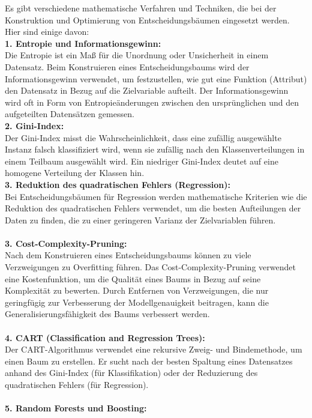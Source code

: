 \documentclass[12pt]{article}
\begin{document}
Es gibt verschiedene mathematische Verfahren und Techniken, die bei der Konstruktion und Optimierung von Entscheidungsbäumen eingesetzt werden. Hier sind einige davon:\\
%
\textbf{1. Entropie und Informationsgewinn:}\\
Die Entropie ist ein Maß für die Unordnung oder Unsicherheit in einem Datensatz. Beim Konstruieren eines Entscheidungsbaums wird der Informationsgewinn verwendet, um festzustellen, wie gut eine Funktion (Attribut) den Datensatz in Bezug auf die Zielvariable aufteilt. Der Informationsgewinn wird oft in Form von Entropieänderungen zwischen den ursprünglichen und den aufgeteilten Datensätzen gemessen.\\[0.2cm]
%
\textbf{2. Gini-Index:}\\
Der Gini-Index misst die Wahrscheinlichkeit, dass eine zufällig ausgewählte Instanz falsch klassifiziert wird, wenn sie zufällig nach den Klassenverteilungen in einem Teilbaum ausgewählt wird. Ein niedriger Gini-Index deutet auf eine homogene Verteilung der Klassen hin.\\[0.2cm]
%
\textbf{3. Reduktion des quadratischen Fehlers (Regression):}\\
Bei Entscheidungsbäumen für Regression werden mathematische Kriterien wie die Reduktion des quadratischen Fehlers verwendet, um die besten Aufteilungen der Daten zu finden, die zu einer geringeren Varianz der Zielvariablen führen.\\\\[0.2cm]
%
\textbf{3. Cost-Complexity-Pruning:}\\
Nach dem Konstruieren eines Entscheidungsbaums können zu viele Verzweigungen zu Overfitting führen. Das Cost-Complexity-Pruning verwendet eine Kostenfunktion, um die Qualität eines Baums in Bezug auf seine Komplexität zu bewerten. Durch Entfernen von Verzweigungen, die nur geringfügig zur Verbesserung der Modellgenauigkeit beitragen, kann die Generalisierungsfähigkeit des Baums verbessert werden.\\\\[0.2cm]
%
\textbf{4. CART (Classification and Regression Trees):}\\
Der CART-Algorithmus verwendet eine rekursive Zweig- und Bindemethode, um einen Baum zu erstellen. Er sucht nach der besten Spaltung eines Datensatzes anhand des Gini-Index (für Klassifikation) oder der Reduzierung des quadratischen Fehlers (für Regression).\\\\[0.2cm]
%
\textbf{5. Random Forests und Boosting:}\\
\end{document}
